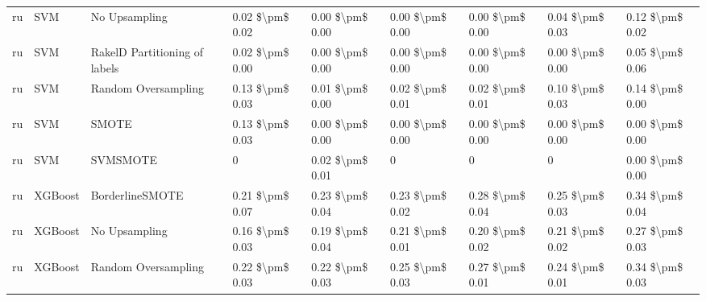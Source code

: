 \begin{tabular}{lllllllll}
      ru &                             SVM &                 No Upsampling &     0.02 \$\textbackslash pm\$ 0.02 &           0.00 \$\textbackslash pm\$ 0.00 &       0.00 \$\textbackslash pm\$ 0.00 &        0.00 \$\textbackslash pm\$ 0.00 &                         0.04 \$\textbackslash pm\$ 0.03 &     0.12 \$\textbackslash pm\$ 0.02 \\
      ru &                             SVM & RakelD Partitioning of labels &     0.02 \$\textbackslash pm\$ 0.00 &           0.00 \$\textbackslash pm\$ 0.00 &       0.00 \$\textbackslash pm\$ 0.00 &        0.00 \$\textbackslash pm\$ 0.00 &                         0.00 \$\textbackslash pm\$ 0.00 &     0.05 \$\textbackslash pm\$ 0.06 \\
      ru &                             SVM &           Random Oversampling &     0.13 \$\textbackslash pm\$ 0.03 &           0.01 \$\textbackslash pm\$ 0.00 &       0.02 \$\textbackslash pm\$ 0.01 &        0.02 \$\textbackslash pm\$ 0.01 &                         0.10 \$\textbackslash pm\$ 0.03 &     0.14 \$\textbackslash pm\$ 0.00 \\
      ru &                             SVM &                         SMOTE &     0.13 \$\textbackslash pm\$ 0.03 &           0.00 \$\textbackslash pm\$ 0.00 &       0.00 \$\textbackslash pm\$ 0.00 &        0.00 \$\textbackslash pm\$ 0.00 &                         0.00 \$\textbackslash pm\$ 0.00 &     0.00 \$\textbackslash pm\$ 0.00 \\
      ru &                             SVM &                      SVMSMOTE &                   0 &           0.02 \$\textbackslash pm\$ 0.01 &                     0 &                      0 &                                       0 &     0.00 \$\textbackslash pm\$ 0.00 \\
      ru &                         XGBoost &               BorderlineSMOTE &     0.21 \$\textbackslash pm\$ 0.07 &           0.23 \$\textbackslash pm\$ 0.04 &       0.23 \$\textbackslash pm\$ 0.02 &        0.28 \$\textbackslash pm\$ 0.04 &                         0.25 \$\textbackslash pm\$ 0.03 &     0.34 \$\textbackslash pm\$ 0.04 \\
      ru &                         XGBoost &                 No Upsampling &     0.16 \$\textbackslash pm\$ 0.03 &           0.19 \$\textbackslash pm\$ 0.04 &       0.21 \$\textbackslash pm\$ 0.01 &        0.20 \$\textbackslash pm\$ 0.02 &                         0.21 \$\textbackslash pm\$ 0.02 &     0.27 \$\textbackslash pm\$ 0.03 \\
      ru &                         XGBoost &           Random Oversampling &     0.22 \$\textbackslash pm\$ 0.03 &           0.22 \$\textbackslash pm\$ 0.03 &       0.25 \$\textbackslash pm\$ 0.03 &        0.27 \$\textbackslash pm\$ 0.01 &                         0.24 \$\textbackslash pm\$ 0.01 &     0.34 \$\textbackslash pm\$ 0.03 \\

\end{tabular}
